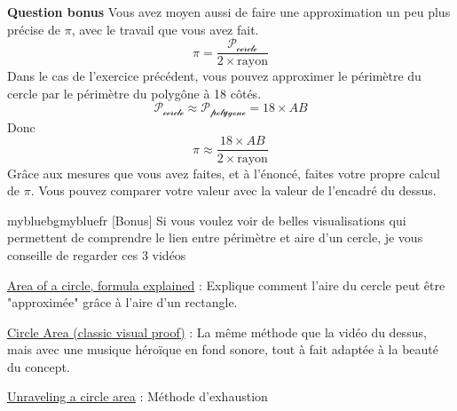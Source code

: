 \documentclass{exam}
\begin{document}
\begin{questions}
  \question \textbf{Question bonus} Vous avez moyen aussi de faire une approximation un peu plus précise de $\pi$, avec le travail que vous avez fait. 
  \[
  \pi = \frac{\mathcal{P_\text{cercle}}}{2 \times \text{rayon}}
  \]
  Dans le cas de l'exercice précédent, vous pouvez approximer le périmètre du cercle par le périmètre du polygône à 18 côtés. 
    \[
  \mathcal{P_\text{cercle}} \approx \mathcal{P_\text{polygone}} = 18 \times AB
  \]
  Donc 
   \[
  \pi \approx \frac{18 \times AB}{2 \times \text{rayon}}
  \]
  Grâce aux mesures que vous avez faites, et à l'énoncé, faites votre propre calcul de $\pi$. Vous pouvez comparer votre valeur avec la valeur de l'encadré du dessus.
\end{questions}

\begin{Indication}{mybluebg}{mybluefr}
  [Bonus] Si vous voulez voir de belles visualisations qui permettent de comprendre le lien entre périmètre et aire d'un cercle, je vous conseille de regarder ces 3 vidéos
  \begin{compactitem}
    \item \href{https://www.youtube.com/watch?v=YokKp3pwVFc}{Area of a circle, formula explained} : Explique comment l'aire du cercle peut être "approximée" grâce à l'aire d'un rectangle. 
    \item \href{https://www.youtube.com/watch?v=-UBLutigNMM}{Circle Area (classic visual proof)} : La même méthode que la vidéo du dessus, mais avec une musique héroïque en fond sonore, tout à fait adaptée à la beauté du concept. 
    \item \href{https://www.youtube.com/watch?v=2sVTar0iXP4}{Unraveling a circle area} : Méthode d'exhaustion
  \end{compactitem}
\end{Indication}
\end{document}
